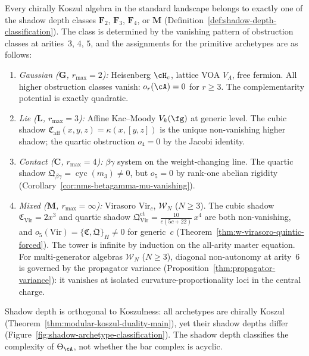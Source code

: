 \begin{theorem}
\label{thm:shadow-archetype-classification}
\ClaimStatusProvedHere
{}
Every chirally Koszul algebra in the standard landscape belongs to
exactly one of the shadow depth classes $\mathbf{F}_2$, $\mathbf{F}_3$,
$\mathbf{F}_4$, or $\mathbf{M}$
\textup{(}Definition~\textup{\ref{def:shadow-depth-classification}}).
The class is determined by the vanishing pattern of obstruction
classes at arities~$3$, $4$, $5$, and the assignments for the
primitive archetypes are as follows:
\begin{enumerate}[label=\textup{(\roman*)}]
\item \emph{Gaussian \textup{(}$\mathbf{G}$, $r_{\max} = 2$\textup{)}:}
  Heisenberg $\cH_c$, lattice VOA $V_\Lambda$, free fermion.
  All higher obstruction classes vanish:
  $o_r(\cA) = 0$ for $r \geq 3$.  The complementarity potential is
  exactly quadratic.

\item \emph{Lie \textup{(}$\mathbf{L}$, $r_{\max} = 3$\textup{)}:}
  Affine Kac--Moody $V_k(\fg)$ at generic level.
  The cubic shadow $\mathfrak{C}_{\mathrm{aff}}(x,y,z) =
  \kappa(x,[y,z])$ is the unique non-vanishing higher shadow; the
  quartic obstruction $o_4 = 0$ by the Jacobi identity.

\item \emph{Contact \textup{(}$\mathbf{C}$, $r_{\max} = 4$\textup{)}:}
  $\beta\gamma$ system on the weight-changing line.
  The quartic shadow $\mathfrak{Q}_{\beta\gamma} =
  \operatorname{cyc}(m_3) \neq 0$, but $o_5 = 0$ by rank-one
  abelian rigidity
  \textup{(}Corollary~\textup{\ref{cor:nms-betagamma-mu-vanishing}}).

\item \emph{Mixed \textup{(}$\mathbf{M}$, $r_{\max} = \infty$\textup{)}:}
  Virasoro $\mathrm{Vir}_c$, $\mathcal{W}_N$ ($N \geq 3$).
  The cubic shadow $\mathfrak{C}_{\mathrm{Vir}} = 2x^3$ and quartic
  shadow $\mathfrak{Q}^{\mathrm{ct}}_{\mathrm{Vir}} =
  \tfrac{10}{c(5c{+}22)}\,x^4$ are both non-vanishing, and
  $o_5(\mathrm{Vir}) = \{\mathfrak{C}, \mathfrak{Q}\}_{H} \neq 0$
  for generic~$c$
  \textup{(}Theorem~\textup{\ref{thm:w-virasoro-quintic-forced}}).
  The tower is infinite by induction on the all-arity master equation.
  For multi-generator algebras $\mathcal{W}_N$ ($N \geq 3$),
  diagonal non-autonomy at arity~$6$ is governed by the
  propagator variance
  \textup{(}Proposition~\textup{\ref{thm:propagator-variance}}):
  it vanishes at isolated curvature-proportionality loci in the
  central charge.
\end{enumerate}
Shadow depth is orthogonal to Koszulness: all archetypes are
chirally Koszul
\textup{(}Theorem~\textup{\ref{thm:modular-koszul-duality-main}}),
yet their shadow depths differ
\textup{(}Figure~\textup{\ref{fig:shadow-archetype-classification})}.
The shadow depth classifies the
complexity of $\Theta_\cA$, not whether the bar complex is acyclic.


\end{theorem}
